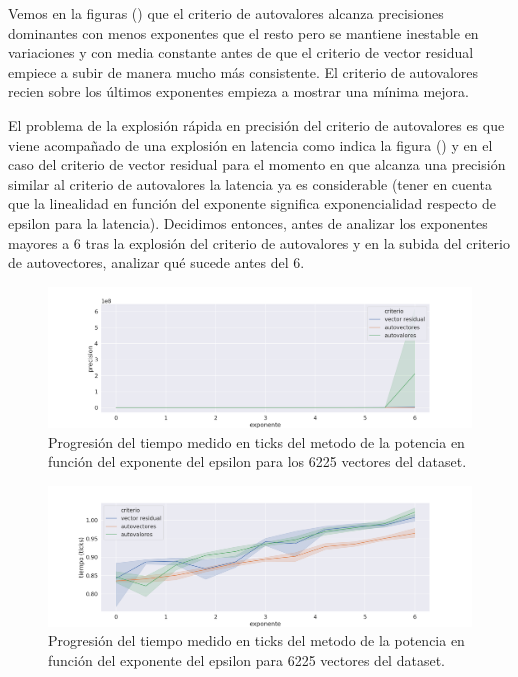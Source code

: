 Vemos en la figuras () que el criterio de autovalores alcanza precisiones dominantes con menos exponentes que el resto pero se mantiene inestable en variaciones y con media constante antes de que el criterio de vector residual empiece a subir de manera mucho más consistente. El criterio de autovalores recien sobre los últimos exponentes empieza a mostrar una mínima mejora.

El problema de la explosión rápida en precisión del criterio de autovalores es que viene acompañado de una explosión en latencia como indica la figura () y en el caso del criterio de vector residual para el momento en que alcanza una precisión similar al criterio de autovalores la latencia ya es considerable (tener en cuenta que la linealidad en función del exponente significa exponencialidad respecto de epsilon para la latencia). Decidimos entonces, antes de analizar los exponentes mayores a $6$ tras la explosión del criterio de autovalores y en la subida del criterio de autovectores, analizar qué sucede antes del $6$.

\begin{figure}[h]
\includegraphics[width=\textwidth]{./img/precision_corto_full.png}
\centering
\caption{Progresión del tiempo medido en ticks del metodo de la potencia en función del exponente del epsilon para los 6225 vectores del dataset.}
\end{figure}

\begin{figure}[h]
\includegraphics[width=\textwidth]{./img/tiempo_corto_full.png}
\centering
\caption{Progresión del tiempo medido en ticks del metodo de la potencia en función del exponente del epsilon para 6225 vectores del dataset.}
\end{figure}

